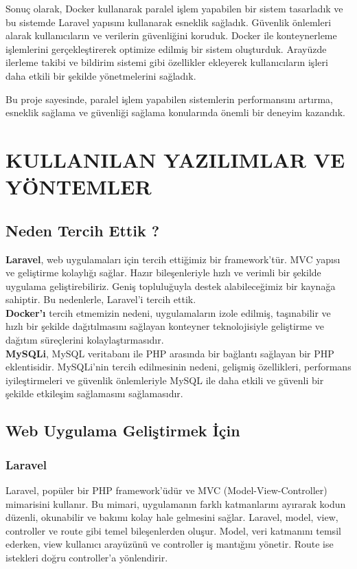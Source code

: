 Sonuç olarak, Docker kullanarak paralel işlem yapabilen bir sistem tasarladık ve bu sistemde Laravel yapısını kullanarak esneklik sağladık. Güvenlik önlemleri alarak kullanıcıların ve verilerin güvenliğini koruduk. Docker ile konteynerleme işlemlerini gerçekleştirerek optimize edilmiş bir sistem oluşturduk. Arayüzde ilerleme takibi ve bildirim sistemi gibi özellikler ekleyerek kullanıcıların işleri daha etkili bir şekilde yönetmelerini sağladık.

Bu proje sayesinde, paralel işlem yapabilen sistemlerin performansını artırma, esneklik sağlama ve güvenliği sağlama konularında önemli bir deneyim kazandık.
\section{KULLANILAN YAZILIMLAR VE YÖNTEMLER}
\subsection{Neden Tercih Ettik ?}
\textbf{Laravel}, web uygulamaları için tercih ettiğimiz bir framework'tür. MVC yapısı ve geliştirme kolaylığı sağlar. Hazır bileşenleriyle hızlı ve verimli bir şekilde uygulama geliştirebiliriz. Geniş topluluğuyla destek alabileceğimiz bir kaynağa sahiptir. Bu nedenlerle, Laravel'i tercih ettik.\\
\textbf{Docker'ı} tercih etmemizin nedeni, uygulamaların izole edilmiş, taşınabilir ve hızlı bir şekilde dağıtılmasını sağlayan konteyner teknolojisiyle geliştirme ve dağıtım süreçlerini kolaylaştırmasıdır.\\
\textbf{MySQLi}, MySQL veritabanı ile PHP arasında bir bağlantı sağlayan bir PHP eklentisidir. MySQLi'nin tercih edilmesinin nedeni, gelişmiş özellikleri, performans iyileştirmeleri ve güvenlik önlemleriyle MySQL ile daha etkili ve güvenli bir şekilde etkileşim sağlamasını sağlamasıdır.
\subsection{Web Uygulama Geliştirmek İçin}
\subsubsection{Laravel }
Laravel, popüler bir PHP framework'üdür ve MVC (Model-View-Controller) mimarisini kullanır. Bu mimari, uygulamanın farklı katmanlarını ayırarak kodun düzenli, okunabilir ve bakımı kolay hale gelmesini sağlar. Laravel, model, view, controller ve route gibi temel bileşenlerden oluşur. Model, veri katmanını temsil ederken, view kullanıcı arayüzünü ve controller iş mantığını yönetir. Route ise istekleri doğru controller'a yönlendirir.\\

